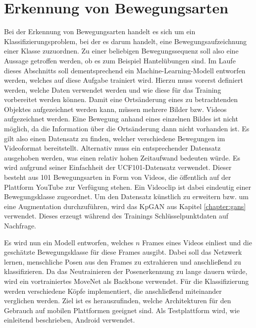\section{Erkennung von Bewegungsarten}
Bei der Erkennung von Bewegungsarten handelt es sich um ein
Klassifizierungsproblem, bei der es darum handelt, eine Bewegungsaufzeichnung
einer Klasse zuzuordnen. Zu einer beliebigen Bewegungssequenz soll also eine
Aussage getroffen werden, ob es zum Beispiel Hantelübungen sind. Im Laufe dieses
Abschnitts soll dementsprechend ein Machine-Learning-Modell entworfen werden,
welches auf diese Aufgabe trainiert wird. Hierzu muss vorerst definiert werden,
welche Daten verwendet werden und wie diese für das Training vorbereitet werden
können. Damit eine Ortsänderung eines zu betrachtenden Objektes aufgezeichnet
werden kann, müssen mehrere Bilder bzw. Videos aufgezeichnet werden. Eine
Bewegung anhand eines einzelnen Bildes ist nicht möglich, da die Information
über die Ortsänderung dann nicht vorhanden ist. Es gilt also einen Datensatz zu
finden, welcher verschiedene Bewegungen im Videoformat bereitstellt. Alternativ
muss ein entsprechender Datensatz ausgehoben werden, was einen relativ hohen
Zeitaufwand bedeuten würde. Es wird aufgrund seiner Einfachheit der
UCF101-Datensatz \cite{ucf101} verwendet. Dieser besteht aus 101 Bewegungsarten
in Form von Videos, die öffentlich auf der Plattform YouTube zur Verfügung
stehen. Ein Videoclip ist dabei eindeutig einer Bewegungsklasse zugeordnet. Um
den Datensatz künstlich zu erweitern bzw. um eine Augmentation durchzuführen,
wird das KpGAN aus Kapitel \ref{chapter:gans} verwendet. Dieses erzeugt während des Trainings Schlüsselpunktdaten auf Nachfrage.

Es wird nun ein Modell entworfen, welches $n$ Frames eines Videos einliest und
die geschätzte Bewegungsklasse für diese Frames ausgibt. Dabei soll das Netzwerk
lernen, menschliche Posen aus den Frames zu extrahieren und anschließend zu
klassifizieren. Da das Neutrainieren der Posenerkennung zu lange dauern würde,
wird ein vortrainiertes MoveNet als Backbone verwendet. Für die Klassifizierung
werden verschiedene Köpfe implementiert, die anschließend miteinander verglichen
werden. Ziel ist es herauszufinden, welche Architekturen für den Gebrauch auf
mobilen Plattformen geeignet sind. Als Testplattform wird, wie einleitend beschrieben, Android verwendet.

